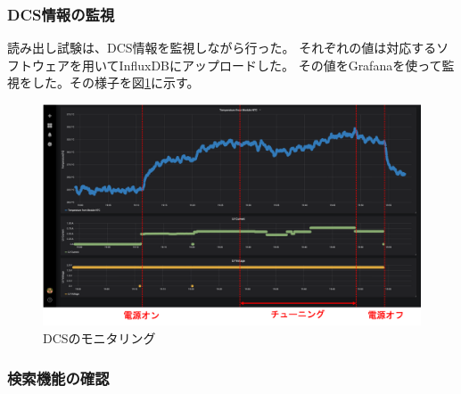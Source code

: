 \clearpage
\subsubsection{DCS情報の監視}
読み出し試験は、DCS情報を監視しながら行った。
それぞれの値は対応するソフトウェアを用いてInfluxDBにアップロードした。
その値をGrafanaを使って監視をした。その様子を図\ref{demo_monitor_dcs}に示す。

\begin{figure}[bpt]\centering
\includegraphics[width=12cm]{demo_monitor_dcs}
\caption[DCSのモニタリング]{DCSのモニタリング}
\label{demo_monitor_dcs}
\end{figure}

\clearpage
\subsubsection{検索機能の確認}

